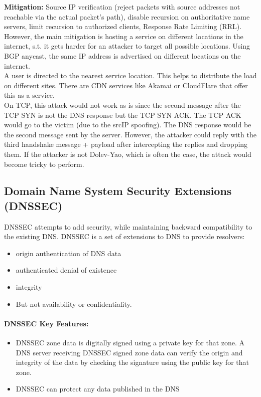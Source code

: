 \textbf{Mitigation:} Source IP verification (reject packets with source addresses not reachable via the actual packet’s path), disable recursion on authoritative name servers, limit recursion to authorized clients, Response Rate Limiting (RRL).\\
However, the main mitigation is hosting a service on different locations in the internet, s.t. it gets harder for an attacker to target all possible locations. Using BGP anycast, the same IP address is advertised on different locations on the internet.\\
A user is directed to the nearest service location. This helps to distribute the load on different sites. There are CDN services like Akamai or CloudFlare that offer this as a service.
\\
On TCP, this attack would not work as is since the second message after the TCP SYN is not the DNS response but the TCP SYN ACK. The TCP ACK would go to the victim (due to the srcIP spoofing). The DNS response would be the second message sent by the server. However, the attacker could reply with the third handshake message + payload after intercepting the replies and dropping them. If the attacker is not Dolev-Yao, which is often the case, the attack would become tricky to perform.

\subsection{Domain Name System Security Extensions (DNSSEC)}

DNSSEC attempts to add security, while maintaining backward compatibility to the
existing DNS. DNSSEC is a set of extensions to DNS to provide resolvers:
\begin{itemize}
    \item origin authentication of DNS data
    \item authenticated denial of existence
    \item integrity
    \item But not availability or confidentiality.
\end{itemize}

\paragraph{DNSSEC Key Features:}
\begin{itemize}
    \item DNSSEC zone data is digitally signed using a private key for that zone. A DNS server receiving DNSSEC signed zone data can verify the origin and integrity of the data by checking the signature using the public key for that zone.
    \item DNSSEC can protect any data published in the DNS
\end{itemize}

